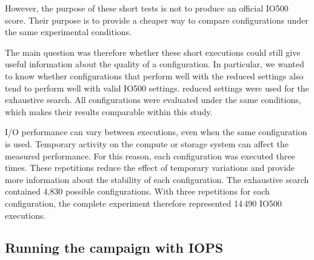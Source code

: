 However, the purpose of these short tests is not to produce an official
IO500 score. Their purpose is to provide a cheaper way to compare
configurations under the same experimental conditions.

The main question was therefore whether these short executions could
still give useful information about the quality of a configuration. In
particular, we wanted to know whether configurations that perform well
with the reduced settings also tend to perform well with valid IO500
settings. 
 reduced settings were used for the exhaustive
search. All configurations were evaluated under the same conditions,
which makes their results comparable within this study.


 I/O performance can vary between executions, even when the same
configuration is used. Temporary activity on the compute or storage
system can affect the measured performance.
For this reason, each configuration was executed three times. These
repetitions reduce the effect of temporary variations and provide more
information about the stability of each configuration.
The exhaustive search contained 4,830 possible configurations. With
three repetitions for each configuration, the complete experiment
therefore represented 14\,490 IO500 executions.

\subsection{Running the campaign with IOPS}
\label{sec:campaign}
\label{sec:ground-truth}



